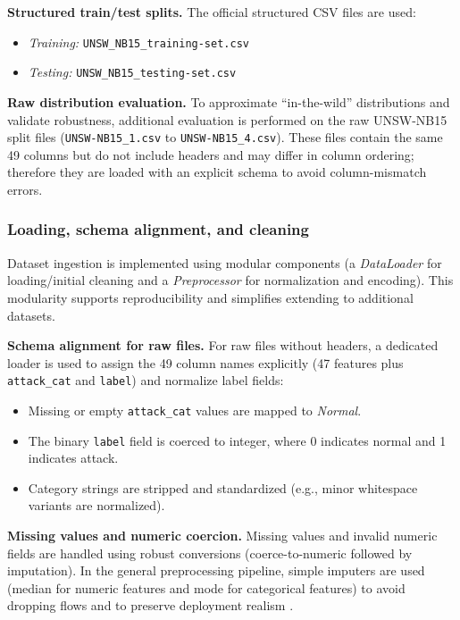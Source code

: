 \documentclass[conference]{IEEEtran}
\begin{document}
\textbf{Structured train/test splits.} The official structured CSV files are used:
\begin{itemize}
  \item \emph{Training:} \texttt{UNSW\_NB15\_training-set.csv}
  \item \emph{Testing:} \texttt{UNSW\_NB15\_testing-set.csv}
\end{itemize}

\textbf{Raw distribution evaluation.} To approximate ``in-the-wild'' distributions and validate robustness, additional evaluation is performed on the raw UNSW-NB15 split files (\texttt{UNSW-NB15\_1.csv} to \texttt{UNSW-NB15\_4.csv}). These files contain the same 49 columns but do not include headers and may differ in column ordering; therefore they are loaded with an explicit schema to avoid column-mismatch errors.

\subsubsection{Loading, schema alignment, and cleaning}
Dataset ingestion is implemented using modular components (a \emph{DataLoader} for loading/initial cleaning and a \emph{Preprocessor} for normalization and encoding). This modularity supports reproducibility and simplifies extending to additional datasets.

\textbf{Schema alignment for raw files.} For raw files without headers, a dedicated loader is used to assign the 49 column names explicitly (47 features plus \texttt{attack\_cat} and \texttt{label}) and normalize label fields:
\begin{itemize}
  \item Missing or empty \texttt{attack\_cat} values are mapped to \emph{Normal}.
  \item The binary \texttt{label} field is coerced to integer, where 0 indicates normal and 1 indicates attack.
  \item Category strings are stripped and standardized (e.g., minor whitespace variants are normalized).
\end{itemize}

\textbf{Missing values and numeric coercion.} Missing values and invalid numeric fields are handled using robust conversions (coerce-to-numeric followed by imputation). In the general preprocessing pipeline, simple imputers are used (median for numeric features and mode for categorical features) to avoid dropping flows and to preserve deployment realism \cite{Pedregosa2011Scikit}.
\end{document}
